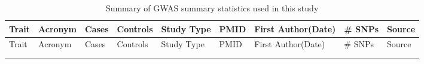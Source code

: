 
\begin{center}

\centering
\begin{longtable}{| L{5cm} | C{1.5cm} | C{1cm} | C{1.5cm} | C{1.5cm} | C{1.5cm} | L{2.5cm} | R{1.5cm} | L{4cm} |}
\caption{Summary of GWAS summary statistics used in this study}\label{tab:gwasm}\\
  \hline{}   Trait & Acronym & Cases & Controls & Study Type & PMID & First Author(Date) & \# SNPs  & Source \\ \hline \hline  
  \endfirsthead
  \hline  {} Trait & Acronym & Cases & Controls & Study Type & PMID & First Author(Date) & \# SNPs  & Source \\ \hline \hline 
  \endhead
  \hline {}  \\ \hline 
  \endfoot
  \hline \hline 
  \endlastfoot


\end{longtable}
\end{center}
